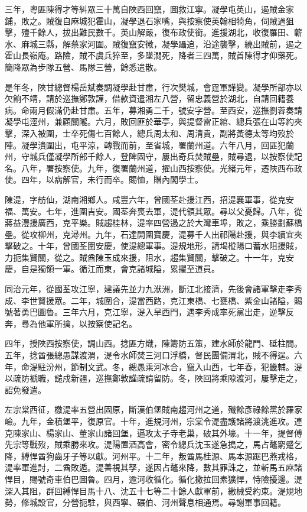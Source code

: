\begin{pinyinscope}
三年，粵匪陳得才等糾眾三十萬自陜西回竄，圖救江寧。凝學屯英山，遏賊金家鋪，敗之。賊復自麻城犯霍山，凝學退石家嘴，與按察使英翰相犄角，伺賊過狙擊，殪千餘人，拔出難民數千。英山解嚴，復布政使銜。進援湖北，收復羅田、蘄水、麻城三縣，解蔡家河圍。賊復竄安徽，凝學躡追，沿途襲擊，繞出賊前，遏之霍山長嶺庵。路險，賊不虞兵猝至，多墜澗死，降者三四萬，賊首陳得才仰藥死。簡降眾為步隊五營、馬隊三營，餘悉遣散。

是年冬，陜甘總督楊岳斌奏調凝學赴甘肅，行次樊城，會霆軍譁變。凝學所部亦以欠餉不靖，請於巡撫鄭敦謹，借款資遣湘左八營，留忠義營於湖北，自請回籍養病。命兩月假滿仍赴甘肅。五年，募湘勇二千，號安字營。至西安，巡撫劉蓉奏請凝學屯涇州，兼顧關隴。六月，敗回匪於華亭，與提督雷正綰、總兵張在山等約夾擊，深入被圍，士卒死傷七百餘人，總兵周太和、周清貴，副將黃德太等均歿於陣。凝學潰圍出，屯平涼，轉戰而前，至省城，署蘭州道。六年八月，回匪犯蘭州，守城兵僅凝學所部千餘人，登陴固守，屢出奇兵焚賊壘，賊尋退，以按察使記名。八年，署按察使。九年，復署蘭州道，擢山西按察使。光緒元年，遷陜西布政使。四年，以病解官，未行而卒。賜恤，贈內閣學士。

陳湜，字舫仙，湖南湘鄉人。咸豐六年，曾國荃赴援江西，招湜襄軍事，從克安福、萬安。七年，進圍吉安。國荃奔喪去軍，湜代領其眾。尋以父憂歸。八年，從蔣益澧援廣西，克平樂。賊趨桂林，湜率四營遏之於大灣車埠，敗之，乘勝劃蘇橋壘。從攻柳州，克潯州。九年，石達開圍寶慶，湜募千人出祁陽赴援，與李續宜夾擊破之。十年，曾國荃圍安慶，使湜總軍事。湜規地形，請堨樅陽口蓄水阻援賊，力扼集賢關，從之。賊酋陳玉成來援，阻水，趨集賢關，擊破之。十一年，克安慶，自是獨領一軍。循江而東，會克諸城隘，累擢至道員。

同治元年，從國荃攻江寧，建議先並力九洑洲，斷江北接濟，先後會諸軍擊走李秀成、李世賢援眾。二年，城圍合，湜當西路，克江東橋、七甕橋、紫金山諸隘，賜號著勇巴圖魯。三年六月，克江寧，湜入旱西門，遇李秀成率死黨出走，逆擊反奔，尋為他軍所擒，以按察使記名。

四年，授陜西按察使，調山西。捻匪方熾，陳籌防五策，建水師於龍門、砥柱間。五年，捻酋張總愚謀渡渭，湜令水師焚三河口浮橋，督民團備渭北，賊不得逞。六年，命湜駐汾州，節制文武。冬，總愚乘河冰合，竄入山西，七年春，犯畿輔。湜以疏防褫職，譴戍新疆，巡撫鄭敦謹疏請留防。冬，陜回將乘隙渡河，屢擊走之，詔免發遣。

左宗棠西征，檄湜率五營出固原，斷漢伯堡賊南趨河州之道，殲餘彥祿餘黨於羅家嶮。九年，金積堡平，復原官。十年，進規河州，宗棠令湜盡護諸將渡洮進攻。連克陳家山、楊家山、董家山諸回堡，逼攻太子寺老巢，破其外壕。十一年，提督傅先宗等戰歿，賊乘勝來攻。湜陽置酒高會，密令總兵沈玉遂急搗之，馬占鼇窮蹙乞降，縛悍酋狗齒牙子等以獻。河州平。十二年，叛酋馬桂源、馬本源踞巴燕戎格，湜率軍進討，二酋敗遁。湜善視其孥，遂因占鼇來降，數其罪誅之，並斬馬五麻諸悍目，賜號奇車伯巴圖魯。四月，逾河收循化。循化撒拉回素獷悍，恃險擾邊。湜深入其阻，群回縛悍目馬十八、沈五十七等二十餘人獻軍前，繳械受約束。湜規地勢，修城設官，分營扼駐，與西寧、碾伯、河州聲息相通焉。尋謝軍事回籍。


\end{pinyinscope}
